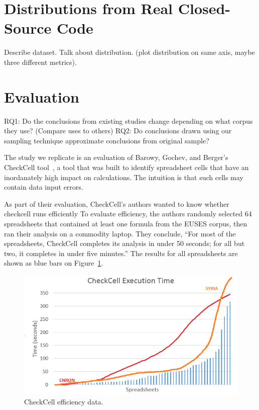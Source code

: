 \documentclass[conference]{IEEEtran}
\begin{document}
\section{Distributions from Real Closed-Source Code}

Describe dataset.
Talk about distribution. (plot distribution on same axis, maybe three different metrics).

\section{Evaluation}

RQ1: Do the conclusions from existing studies change depending on what corpus they use? (Compare uses to others)
RQ2: Do conclusions drawn using our sampling technique approximate conclusions from original sample?

The study we replicate is an evaluation of Barowy, Gochev, and Berger's
CheckCell tool~\cite{barowy14}, a tool that was built to identify spreadsheet
cells that have an inordanately high impact on calculations.
The intuition is that such cells may contain data input errors.

As part of their evaluation, CheckCell's authors wanted to know whether checkcell runs efficiently
To evaluate efficiency, the authors randomly selected 64 spreadsheets that contained at least one
formula from the EUSES corpus, then ran their analysis on a commodity laptop.
They conclude, ``For most of the spreadsheets, CheckCell completes its analysis in under 50 seconds;
for all but two, it completes in under five minutes.''
The results for all spreadsheets are shown as blue bars on Figure~\ref{fig:effectiveness}.


\begin{figure}[!t]
\centering
\includegraphics[width=\columnwidth]{checkcell.png}
\caption{CheckCell efficiency data.}
\label{fig:effectiveness}
\end{figure}
\end{document}
